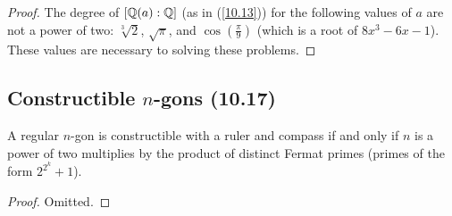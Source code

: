 \begin{proof}
    The degree of $[\mathbb{Q}(a) : \mathbb{Q}]$ (as in (\ref{10.13})) for the following values of $a$
    are not a power of two: $\sqrt[3]{2}$, $\sqrt{\pi}$, and $\cos(\frac{\pi}{9})$ (which
    is a root of $8x^3 - 6x - 1$). These values are necessary to solving these problems.
\end{proof}

\subsection{Constructible $n$-gons (10.17)} \label{10.17}

A regular $n$-gon is constructible with a ruler and compass if and only if $n$ is a power
of two multiplies by the product of distinct Fermat primes (primes of the form
$2^{2^k} + 1$).

\begin{proof}
    Omitted.
\end{proof}
